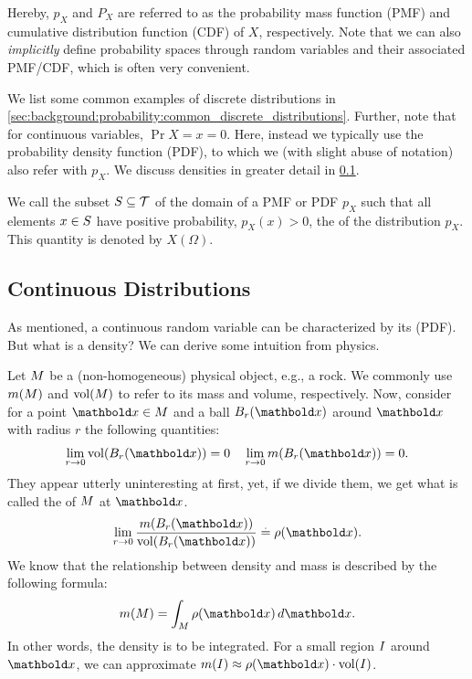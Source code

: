 Hereby, $p_X$ and $P_X$ are referred to as the probability mass function (PMF) and cumulative distribution function (CDF) of $X$, respectively.
Note that we can also \emph{implicitly} define probability spaces through random variables and their associated PMF/CDF, which is often very convenient.

We list some common examples of discrete distributions in \cref{sec:background:probability:common_discrete_distributions}.
Further, note that for continuous variables, $\Pr{X=x}=0$.
Here, instead we typically use the probability density function (PDF), to which we (with slight abuse of notation) also refer with $p_X$. We discuss densities in greater detail in \cref{sec:fundamentals:continuous_distributions}.

We call the subset $S \subseteq \mathcal{T}$ of the domain of a PMF or PDF $p_X$ such that all elements $x \in S$ have positive probability, $p_X(x) > 0$, the  of the distribution $p_X$. This quantity is denoted by $X(\Omega)$.

\subsection{Continuous Distributions}\label{sec:fundamentals:continuous_distributions}

As mentioned, a continuous random variable can be characterized by its  (PDF).
But what is a density? We can derive some intuition from physics.

Let $M$ be a (non-homogeneous) physical object, e.g., a rock.
We commonly use $m(M)$ and $\mathrm{vol}(M)$ to refer to its mass and volume, respectively. Now, consider for a point $\vx \in \set{M}$ and a ball $B_r(\vx)$ around $\vx$ with radius $r$ the following quantities: \begin{align*}
  \lim_{r\to0} \mathrm{vol}(B_r(\vx)) = 0 \quad \lim_{r\to0} m(B_r(\vx)) = 0.
\end{align*} They appear utterly uninteresting at first, yet, if we divide them, we get what is called the  of $M$ at $\vx$.
\begin{align*}
  \lim_{r\to0} \frac{m(B_r(\vx))}{\mathrm{vol}(B_r(\vx))} \eqdef \rho(\vx).
\end{align*}
We know that the relationship between density and mass is described by the following formula: \begin{align*}
  m(\set{M}) = \int_\set{M} \rho(\vx) \,d\vx.
\end{align*}
In other words, the density is to be integrated. For a small region $I$ around $\vx$, we can approximate $m(\set{I}) \approx \rho(\vx) \cdot \mathrm{vol}(\set{I})$.

